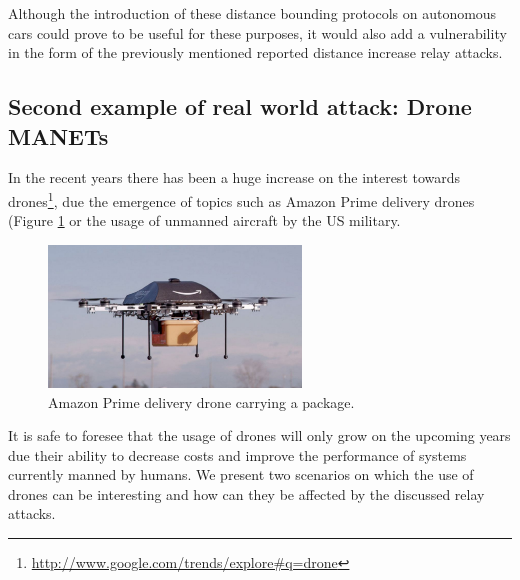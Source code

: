 \documentclass{article}
\begin{document}
Although the introduction of these distance bounding protocols on autonomous cars could prove to be useful for these purposes, it would also add a vulnerability in the form of the previously mentioned reported distance increase relay attacks.\\


\subsection{Second example of real world attack: Drone MANETs}

In the recent years there has been a huge increase on the interest towards drones\footnote{\url{http://www.google.com/trends/explore#q=drone}}, due the emergence of topics such as Amazon Prime delivery drones (Figure \ref{fig:amazondrone} or the usage of unmanned aircraft by the US military.\\


\begin{figure}[h!]
  \centering
    \includegraphics[width=0.6\textwidth]{images/amazonprimedrone.png}
  \caption{Amazon Prime delivery drone carrying a package.}
  \label{fig:amazondrone}
\end{figure}

It is safe to foresee that the usage of drones will only grow on the upcoming years due their ability to decrease costs and improve the performance of systems currently manned by humans. We present two scenarios on which the use of drones can be interesting and how can they be affected by the discussed relay attacks.\\
\end{document}

